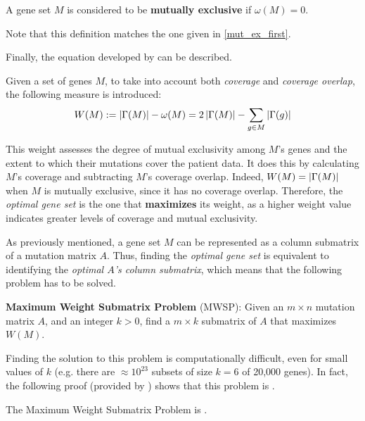 \begin{definition}
    A gene set $M$ is considered to be \textbf{mutually exclusive} if $\omega(M) = 0$.
\end{definition}

Note that this definition matches the one given in \cref{mut_ex_first}.

Finally, the equation developed by \textcite{dendrix} can be described.

\begin{definition} \label{weight}
    Given a set of genes $M$, to take into account both \textit{coverage} and \textit{coverage overlap}, the following measure is introduced: $$W(M): = \left|\Gamma(M)\right| - \omega(M) = 2 \left|\Gamma(M)\right| - \sum_{g \in M} {\left|\Gamma(g)\right|}$$
\end{definition}

This weight assesses the degree of mutual exclusivity among $M$'s genes and the extent to which their mutations cover the patient data. It does this by calculating $M$'s coverage and subtracting $M$'s coverage overlap. Indeed, $W(M) = \left|\Gamma(M)\right|$ when $M$ is mutually exclusive, since it has no coverage overlap. Therefore, the \textit{optimal gene set} is the one that \textbf{maximizes} its weight, as a higher weight value indicates greater levels of coverage and mutual exclusivity.

As previously mentioned, a gene set $M$ can be represented as a column submatrix of a mutation matrix $A$. Thus, finding the \textit{optimal gene set} is equivalent to identifying the \textit{optimal $A$'s column submatrix}, which means that the following problem has to be solved.

\begin{displayquote}\label{mwsp}
    \textbf{Maximum Weight Submatrix Problem} (MWSP): Given an $m \times n$ mutation matrix $A$, and an integer $k > 0$, find a $m \times k$ submatrix of $A$ that maximizes $W(M)$.
\end{displayquote}

Finding the solution to this problem is computationally difficult, even for small values of $k$ (e.g. there are $\approx 10^{23}$ subsets of size $k = 6$ of 20,000 genes). In fact, the following proof (provided by \textcite{dendrix}) shows that this problem is \NPComplete.

\begin{theorem} \label{mwsp proof}
    The Maximum Weight Submatrix Problem is \NPComplete.
\end{theorem}

